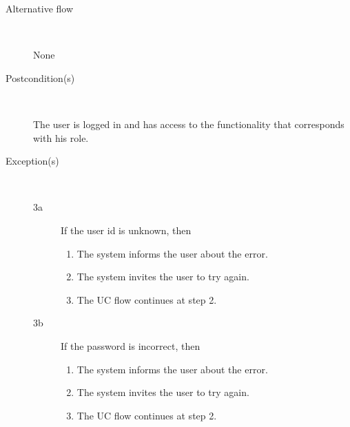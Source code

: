 \begin{description}
\begin{enumerate}
	\end{enumerate}
	\item[Alternative flow] \
		\par None
	\item[Postcondition(s)] \ 
		\par The user is logged in and has access to the functionality that
		corresponds with his role.
	\item[Exception(s)] \
	\begin{description}
		\item[3a] If the user id is unknown, then
		\begin{enumerate}
		  \item The system informs the user about the error.
		  \item The system invites the user to try again.
		  \item The UC flow continues at step 2.
		\end{enumerate}
		\item[3b] If the password is incorrect, then
		\begin{enumerate}
		  \item The system informs the user about the error.
		  \item The system invites the user to try again.
		  \item The UC flow continues at step 2.
		\end{enumerate}
	\end{description}
\end{description}

